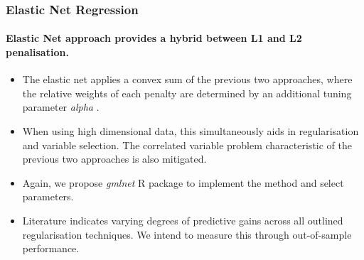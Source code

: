 \begin{frame} 
    \frametitle{Elastic Net Regression} 
    \framesubtitle{Elastic Net approach provides a hybrid between L1 and L2 penalisation.} 
    \begin{itemize}
        \item The elastic net applies a convex sum of the previous two approaches, where the relative weights of each penalty are determined by an additional tuning parameter \emph{alpha} \parencite{zhou_hastie_2005}. 
        \item When using high dimensional data, this simultaneously aids in regularisation and variable selection. The correlated variable problem characteristic of the previous two approaches is also mitigated.
        \item Again, we propose \emph{gmlnet} R package to implement the method and select parameters. 
        \vspace{2mm}
        \item Literature indicates varying degrees of predictive gains across all outlined regularisation techniques. We intend to measure this through out-of-sample performance. 
    \end{itemize}

    
\end{frame}